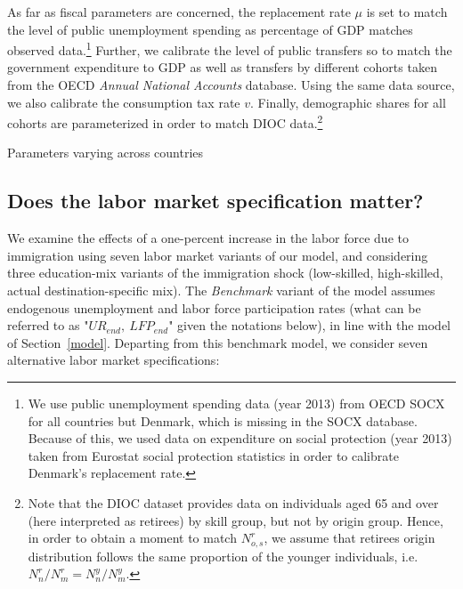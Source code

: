 \documentclass[a4paper,12pt]{article}
\begin{document}
As far as fiscal parameters are concerned, the replacement rate $\mu$ is set to match the level of public unemployment spending as percentage of GDP matches observed data.\footnote{We use public unemployment spending data (year  2013) from OECD SOCX for all countries but Denmark, which is missing in the SOCX database. Because of this, we used data on expenditure on social protection (year 2013) taken from Eurostat social protection statistics in order to calibrate Denmark's replacement rate.} Further, we calibrate the level of public transfers so to match the government expenditure to GDP as well as transfers by different cohorts taken from the OECD \textit{Annual National Accounts} database. Using the same data source, we also calibrate the consumption tax rate $v$. Finally, demographic shares for all cohorts are parameterized in order to match DIOC data.\footnote{Note that the DIOC dataset provides data on individuals aged 65 and over (here interpreted as retirees) by skill group, but not by origin group. Hence, in order to obtain a moment to match $N^r_{o,s}$, we assume that retirees origin distribution follows the same proportion of the younger individuals, i.e. $N^r_n/N^r_m=N^y_n/N^y_m$.}

\begin{table}[htb!]
\centering
\par
\caption{Parameters varying across countries} \label{tab:parameters_country_specific}
\footnotesize

\end{table}


\subsection{Does the labor market specification matter? \label{sensitivity_to_labor_market}}

We examine the effects of a one-percent increase in the labor force due to immigration using seven labor market variants of our model, and considering three education-mix variants of the immigration shock (low-skilled, high-skilled, actual destination-specific mix). The \textit{Benchmark} variant of the model assumes endogenous unemployment and labor force participation rates (what can be referred to as "$UR_{end},~LFP_{end}$" given the notations below), in line with the model of Section~\ref{model}. Departing from this benchmark model, we consider seven alternative labor market specifications:
\end{document}
